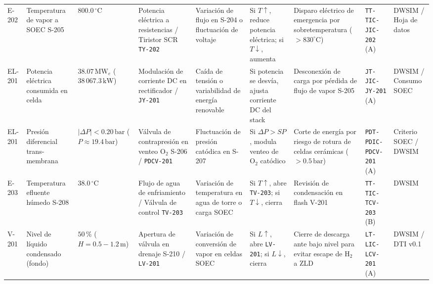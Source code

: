 \documentclass[10pt,letterpaper]{article}
\begin{document}
\begin{landscape}
\begin{longtable}{|p{1.4cm}|p{2.3cm}|p{2.0cm}|p{2.9cm}|p{2.8cm}|p{3.0cm}|p{3.4cm}|p{2.5cm}|p{1.5cm}|}
\rowcolor{tablerowalt}\multicolumn{9}{|l|}{\textbf{\color{navyblue}Área 200: Electrólisis SOEC de Alta Temperatura y Generación de $\text{H}_2$ Verde}} \\ \hline

E-202 & Temperatura de vapor a SOEC S-205 & $800.0\,^\circ\text{C}$ & Potencia eléctrica a resistencias / Tiristor SCR \texttt{TY-202} & Variación de flujo en S-204 o fluctuación de voltaje & Si $T \uparrow$, reduce potencia eléctrica; si $T \downarrow$, aumenta & Disparo eléctrico de emergencia por sobretemperatura ($>830^\circ\text{C}$) & \texttt{TT-TIC-JIC-202} (A) & DWSIM / Hoja de datos \\ \hline

EL-201 & Potencia eléctrica consumida en celda & $38.07\,\text{MW}_e$ ($38\,067.3\,\text{kW}$) & Modulación de corriente DC en rectificador / \texttt{JY-201} & Caída de tensión o variabilidad de energía renovable & Si potencia se desvía, ajusta corriente DC del stack & Desconexión de carga por pérdida de flujo de vapor S-205 & \texttt{JT-JIC-JY-201} (A) & DWSIM / Consumo SOEC \\ \hline

EL-201 & Presión diferencial trans-membrana & $|\Delta P| < 0.20\,\text{bar}$ ($P \approx 19.4\,\text{bar}$) & Válvula de contrapresión en venteo $\text{O}_2$ S-206 / \texttt{PDCV-201} & Fluctuación de presión catódica en S-207 & Si $\Delta P > SP$, modula venteo de $\text{O}_2$ catódico & Corte de energía por riesgo de rotura de celdas cerámicas ($>0.5\,\text{bar}$) & \texttt{PDT-PDIC-}\allowbreak\texttt{PDCV-201} (A) & Criterio SOEC / DWSIM \\ \hline

E-203 & Temperatura efluente húmedo S-208 & $38.0\,^\circ\text{C}$ & Flujo de agua de enfriamiento / Válvula de control \texttt{TV-203} & Variación de temperatura en agua de torre o carga SOEC & Si $T \uparrow$, abre \texttt{TV-203}; si $T \downarrow$, cierra & Revisión de condensación en flash V-201 & \texttt{TT-TIC-TCV-203} (B) & DWSIM \\ \hline

V-201 & Nivel de líquido condensado (fondo) & $50\,\%$ ($H = 0.5 - 1.2\,\text{m}$) & Apertura de válvula en drenaje S-210 / \texttt{LV-201} & Variación de conversión de vapor en celdas SOEC & Si $L \uparrow$, abre \texttt{LV-201}; si $L \downarrow$, cierra & Cierre de descarga ante bajo nivel para evitar escape de $\text{H}_2$ a ZLD & \texttt{LT-LIC-LCV-201} (A) & DWSIM / DTI v0.1 \\ \hline


\end{longtable}
\end{landscape}
\end{document}
